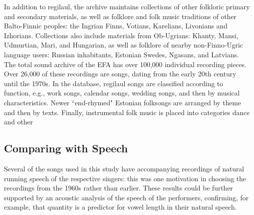 In addition to regilaul, the archive maintains collections of other folkloric primary and secondary materials, as well as folklore and folk music traditions of other Balto-Finnic peoples: the Ingrian Finns, Votians, Karelians, Livonians and Izhorians. Collections also include materials from Ob-Ugrians: Khanty, Mansi, Udmurtian, Mari, and Hungarian, as well as folklore of nearby non-Finno-Ugric language users: Russian inhabitants, Estonian Swedes, Ngasans, and Latvians. 
The total sound archive of the EFA has over 100,000 individual recording pieces. Over 26,000 of these recordings are songs, dating from the early 20th century until the 1970s. In the database, regilaul songs are classified according to function, e.g., work songs, calendar songs, wedding songs, and then by musical characteristics. Newer ``end-rhymed" Estonian folksongs are arranged by theme and then by texts. Finally, instrumental folk music is placed into categories dance and other 
%
\subsection{Comparing with Speech} 

Several of the songs used in this study have accompanying recordings of natural running speech of the respective singers: this was one motivation in choosing the recordings from the 1960s rather than earlier. These results could be further supported by an acoustic analysis of the speech of the performers, confirming, for example, that quantity is a predictor for vowel length in their natural speech. 

%
%
%
%

